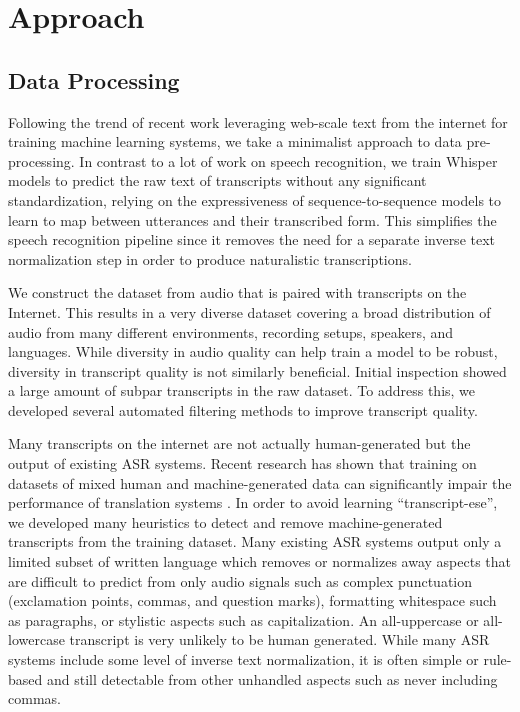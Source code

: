 \documentclass[nohyperref]{article}
\theoremstyle{plain}
\theoremstyle{definition}
\theoremstyle{remark}
\begin{document}
\section{Approach}\label{sec:approach}

\subsection{Data Processing}\label{subsec:data}

Following the trend of recent work leveraging web-scale text from the internet for training machine learning systems, we take a minimalist approach to data pre-processing. In contrast to a lot of work on speech recognition, we train Whisper models to predict the raw text of transcripts without any significant standardization, relying on the expressiveness of sequence-to-sequence models to learn to map between utterances and their transcribed form. This simplifies the speech recognition pipeline since it removes the need for a separate inverse text normalization step in order to produce naturalistic transcriptions. 

We construct the dataset from audio that is paired with transcripts on the Internet. This results in a very diverse dataset covering a broad distribution of audio from many different environments, recording setups, speakers, and languages. While diversity in audio quality can help train a model to be robust, diversity in transcript quality is not similarly beneficial. Initial inspection showed a large amount of subpar transcripts in the raw dataset. To address this, we developed several automated filtering methods to improve transcript quality. 

Many transcripts on the internet are not actually human-generated but the output of existing ASR systems. Recent research has shown that training on datasets of mixed human and machine-generated data can significantly impair the performance of translation systems \cite{ghorbani2021scaling}. In order to avoid learning ``transcript-ese'', we developed many heuristics to detect and remove machine-generated transcripts from the training dataset. Many existing ASR systems output only a limited subset of written language which removes or normalizes away aspects that are difficult to predict from only audio signals such as complex punctuation (exclamation points, commas, and question marks), formatting whitespace such as paragraphs, or stylistic aspects such as capitalization. An all-uppercase or all-lowercase transcript is very unlikely to be human generated. While many ASR systems include some level of inverse text normalization, it is often simple or rule-based and still detectable from other unhandled aspects such as never including commas.
\end{document}
